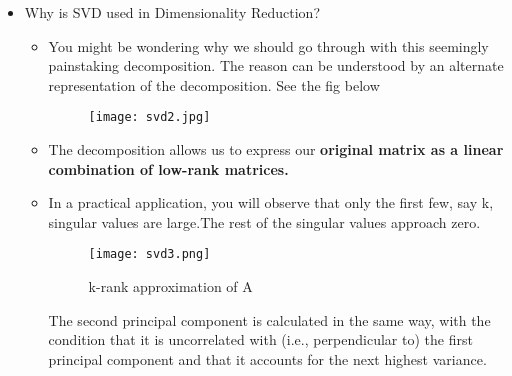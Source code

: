 \documentclass[a4paper, 11pt]{article}
\begin{document}
\begin{itemize}
\begin{itemize}
    \end{itemize}
    \item  Why is SVD used in Dimensionality Reduction?
    \begin{itemize}
        \item You might be wondering why we should go through with this seemingly painstaking decomposition. The reason can be understood by an alternate representation of the decomposition. See the fig below
        \begin{figure}[h!]
            \centering
            \texttt{[image: svd2.jpg]}
            \label{fig:svd2}
          \end{figure}
        \item The decomposition allows us to express our \textbf{original matrix as a linear combination of low-rank matrices.}
        \item In a practical application, you will observe that only the first few, say k, singular values are large.The rest of the singular values approach zero.
  \begin{figure}[h!]
    \centering
    \texttt{[image: svd3.png]}
    \caption{k-rank approximation of A}
    \label{fig:svd3}
  \end{figure}
  The second principal component is calculated in the same way, with the condition that it is uncorrelated with (i.e., perpendicular to) the first principal component and that it accounts for the next highest variance.
    \end{itemize}  
\end{itemize}
\end{document}

